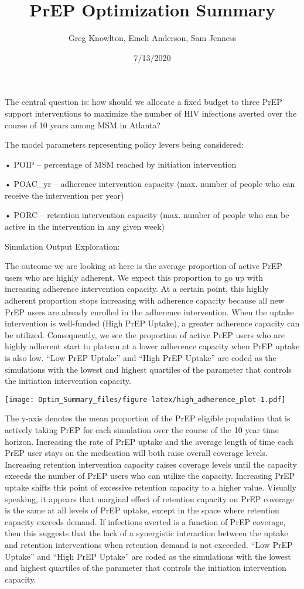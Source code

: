 \documentclass[
]{article}
\title{PrEP Optimization Summary}
\author{Greg Knowlton, Emeli Anderson, Sam Jenness}
\date{7/13/2020}
\begin{document}
\maketitle

The central question is: how should we allocate a fixed budget to three
PrEP support interventions to maximize the number of HIV infections
averted over the course of 10 years among MSM in Atlanta?

The model parameters representing policy levers being considered:

• POIP -- percentage of MSM reached by initiation intervention

• POAC\_yr -- adherence intervention capacity (max. number of people who
can receive the intervention per year)

• PORC -- retention intervention capacity (max. number of people who can
be active in the intervention in any given week)

Simulation Output Exploration:

The outcome we are looking at here is the average proportion of active
PrEP users who are highly adherent. We expect this proportion to go up
with increasing adherence intervention capacity. At a certain point,
this highly adherent proportion stops increasing with adherence capacity
because all new PrEP users are already enrolled in the adherence
intervention. When the uptake intervention is well-funded (High PrEP
Uptake), a greater adherence capacity can be utilized. Consequently, we
see the proportion of active PrEP users who are highly adherent start to
plateau at a lower adherence capacity when PrEP uptake is also low.
``Low PrEP Uptake'' and ``High PrEP Uptake'' are coded as the
simulations with the lowest and highest quartiles of the parameter that
controls the initiation intervention capacity.

\texttt{[image: Optim\_Summary\_files/figure-latex/high\_adherence\_plot-1.pdf]}

The y-axis denotes the mean proportion of the PrEP eligible population
that is actively taking PrEP for each simulation over the course of the
10 year time horizon. Increasing the rate of PrEP uptake and the average
length of time each PrEP user stays on the medication will both raise
overall coverage levels. Increasing retention intervention capacity
raises coverage levels until the capacity exceeds the number of PrEP
users who can utilize the capacity. Increasing PrEP uptake shifts this
point of excessive retention capacity to a higher value. Visually
speaking, it appears that marginal effect of retention capacity on PrEP
coverage is the same at all levels of PrEP uptake, except in the space
where retention capacity exceeds demand. If infections averted is a
function of PrEP coverage, then this suggests that the lack of a
synergistic interaction between the uptake and retention interventions
when retention demand is not exceeded. ``Low PrEP Uptake'' and ``High
PrEP Uptake'' are coded as the simulations with the lowest and highest
quartiles of the parameter that controls the initiation intervention
capacity.
\end{document}
